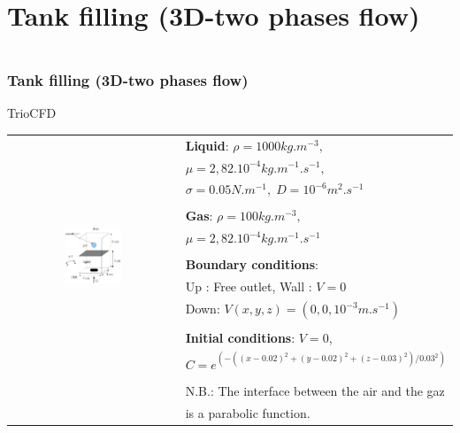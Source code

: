\documentclass[10pt, hyperref={unicode=true,pdfusetitle, bookmarks=true,bookmarksnumbered=false,bookmarksopen=false, breaklinks=false,pdfborder={0 0 1},backref=true,colorlinks=true,linkcolor=darkblue,pageanchor}]{beamer}
\begin{document}
\section{{\bf{Tank filling (3D-two phases flow)}}}
\begin{frame}
\begin{columns}[c] 
\tableofcontents[sections={1-9},currentsection, currentsubsection]
\tableofcontents[sections={10-16},currentsection, currentsubsection]
\end{columns}
\end{frame}
\begin{frame}
\frametitle{Tank filling (3D-two phases flow)}
\begin{block}{TrioCFD}


\begin{tabular}{cl}
\multirow{14}{*}{\includegraphics[width=0.35\textwidth]{PICTURES/tank3D}}
 & \textbf{Liquid}: $\rho=1000kg.m^{-3},$ \tabularnewline
 & $\mu=2,82.10^{-4}kg.m^{-1}.s^{-1},$ \tabularnewline
 & $\sigma=0.05N.m^{-1},\; D=10^{-6}m^{2}.s^{-1}$\tabularnewline
 & \tabularnewline
 & \textbf{Gas}: $\rho=100kg.m^{-3},$\tabularnewline
 & $\mu=2,82.10^{-4}kg.m^{-1}.s^{-1}$\tabularnewline
 & \tabularnewline
 & \textbf{Boundary conditions}:  \tabularnewline
 & Up : Free outlet, \hspace{0.5cm} Wall : $V=0$ \tabularnewline
 & Down: $V(x,y,z)=(0,0,10^{-3}m.s^{-1})$\tabularnewline
 & \tabularnewline
 & \textbf{Initial conditions}: $V=0$, \tabularnewline
 & $C=e^{(-((x-0.02)^{2}+(y-0.02)^{2}+(z-0.03)^{2})/0.03^{2})}$ \tabularnewline
 & \tabularnewline
 & N.B.: The interface between the air and the gaz\tabularnewline
 & is a parabolic function.\tabularnewline
\end{tabular}

\end{block}
\end{frame}
\end{document}

